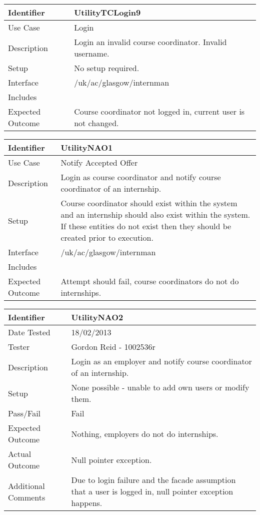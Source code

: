 \vspace{2em}

\begin{tabularx}{\textwidth}{|T|L|}
\hline
Identifier & UtilityTCLogin9\\
\hline
Use Case & Login \\
\hline
Description & Login an invalid course coordinator. Invalid username.\\
\hline
Setup & No setup required. \\
\hline
Interface & /uk/ac/glasgow/internman \\
\hline
Includes & \\
\hline
Expected Outcome & Course coordinator not logged in, current user is
not changed. \\
\hline
\end{tabularx}

\begin{tabularx}{\textwidth}{|T|L|}
\hline
Identifier & UtilityNAO1\\
\hline
Use Case & Notify Accepted Offer \\
\hline
Description & Login as course coordinator and notify course
coordinator of an internship.\\
\hline
Setup & Course coordinator should exist within the system and an
internship should also exist within the system. If these entities do
not exist then they should be created prior to execution.\\
\hline
Interface & /uk/ac/glasgow/internman \\
\hline
Includes & \\
\hline
Expected Outcome & Attempt should fail, course coordinators do not do
internships.\\
\hline
\end{tabularx}

\vspace{2em}

\begin{tabularx}{\textwidth}{|T|L|}
\hline
Identifier & UtilityNAO2\\
\hline
Date Tested & 18/02/2013\\
\hline
Tester & Gordon Reid - 1002536r\\
\hline
Description & Login as an employer and notify course coordinator of an 
internship.\\
\hline
Setup & None possible - unable to add own users or modify them.\\
\hline
Pass/Fail & Fail\\
\hline
Expected Outcome & Nothing, employers do not do internships.\\
\hline
Actual Outcome & Null pointer exception.\\
\hline
Additional Comments & Due to login failure and the facade assumption that a
user is logged in, null pointer exception happens.\\
\hline
\end{tabularx}

